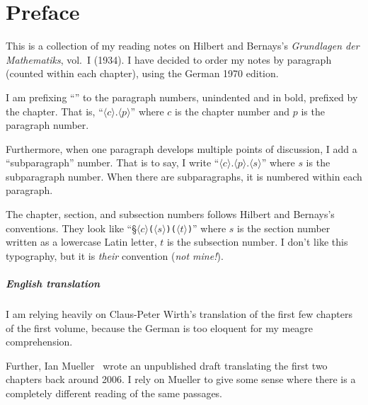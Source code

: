 \chapter{Preface}

This is a collection of my reading notes on Hilbert and Bernays's
\emph{Grundlagen der Mathematiks}, vol.\ I (1934). I have decided to
order my notes by paragraph (counted within each chapter), using the
German 1970 edition.

I am prefixing ``\pilcrow'' to the paragraph numbers, unindented and
in bold, prefixed by the chapter. That is, ``\pilcrow$\langle c\rangle.\langle p\rangle$''
where $c$ is the chapter number and $p$ is the paragraph number.

Furthermore, when one paragraph develops multiple points of
discussion, I add a ``subparagraph'' number. That is to say, I write
``\pilcrow$\langle c\rangle.\langle p\rangle.\langle s\rangle$''
where $s$ is the subparagraph number. When there are subparagraphs, it
is numbered within each paragraph.

The chapter, section, and subsection numbers follows Hilbert and
Bernays's conventions. They look like
``\S$\langle c\rangle$\texttt{(}$\langle s\rangle$\texttt{)}\texttt{(}$\langle t\rangle$\texttt{)}''
where $s$ is the section number written as a lowercase Latin letter,
$t$ is the subsection number. I don't like this typography, but it is
\emph{their} convention (\emph{not mine!\/}).

\paragraph*{English translation}
I am relying heavily on Claus-Peter Wirth's translation of the first
few chapters of the first volume, because the German is too eloquent
for my meagre comprehension.

Further, Ian Mueller~\cite{mueller2006grundlagen} wrote an unpublished
draft translating the first two chapters back around 2006. I rely on
Mueller to give some sense where there is a completely different
reading of the same passages.

